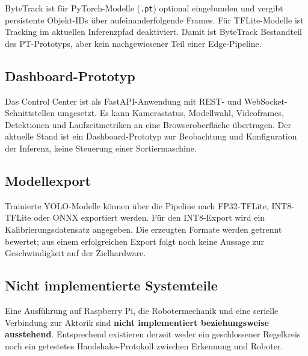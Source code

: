 ByteTrack ist für PyTorch-Modelle (\texttt{.pt}) optional eingebunden und vergibt persistente Objekt-IDs über aufeinanderfolgende Frames. Für TFLite-Modelle ist Tracking im aktuellen Inferenzpfad deaktiviert. Damit ist ByteTrack Bestandteil des PT-Prototyps, aber kein nachgewiesener Teil einer Edge-Pipeline.

\subsection{Dashboard-Prototyp}
Das Control Center ist als FastAPI-Anwendung mit REST- und WebSocket-Schnittstellen umgesetzt. Es kann Kamerastatus, Modellwahl, Videoframes, Detektionen und Laufzeitmetriken an eine Browseroberfläche übertragen. Der aktuelle Stand ist ein Dashboard-Prototyp zur Beobachtung und Konfiguration der Inferenz, keine Steuerung einer Sortiermaschine.

\subsection{Modellexport}
Trainierte YOLO-Modelle können über die Pipeline nach FP32-TFLite, INT8-TFLite oder ONNX exportiert werden. Für den INT8-Export wird ein Kalibrierungsdatensatz angegeben. Die erzeugten Formate werden getrennt bewertet; aus einem erfolgreichen Export folgt noch keine Aussage zur Geschwindigkeit auf der Zielhardware.

\subsection{Nicht implementierte Systemteile}
Eine Ausführung auf Raspberry Pi, die Robotermechanik und eine serielle Verbindung zur Aktorik sind \textbf{nicht implementiert beziehungsweise ausstehend}. Entsprechend existieren derzeit weder ein geschlossener Regelkreis noch ein getestetes Handshake-Protokoll zwischen Erkennung und Roboter.
